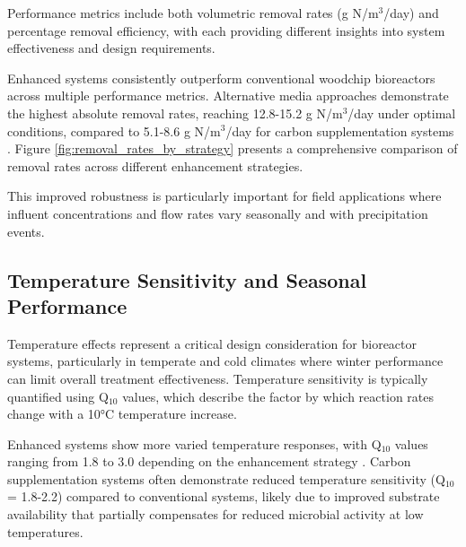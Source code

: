 \documentclass[12pt,a4paper]{article}
\begin{document}
 Performance metrics include both volumetric removal rates (g N/m$^3$/day) and percentage removal efficiency, with each providing different insights into system effectiveness and design requirements.

Enhanced systems consistently outperform conventional woodchip bioreactors across multiple performance metrics.  Alternative media approaches demonstrate the highest absolute removal rates, reaching 12.8-15.2 g N/m$^3$/day under optimal conditions, compared to 5.1-8.6 g N/m$^3$/day for carbon supplementation systems \citep{RN242, RN629, RN958}. Figure \ref{fig:removal_rates_by_strategy} presents a comprehensive comparison of removal rates across different enhancement strategies.

 This improved robustness is particularly important for field applications where influent concentrations and flow rates vary seasonally and with precipitation events.

\subsection{Temperature Sensitivity and Seasonal Performance}

Temperature effects represent a critical design consideration for bioreactor systems, particularly in temperate and cold climates where winter performance can limit overall treatment effectiveness.  Temperature sensitivity is typically quantified using Q$_{10}$ values, which describe the factor by which reaction rates change with a 10°C temperature increase.

 Enhanced systems show more varied temperature responses, with Q$_{10}$ values ranging from 1.8 to 3.0 depending on the enhancement strategy \citep{RN635, RN632}. Carbon supplementation systems often demonstrate reduced temperature sensitivity (Q$_{10}$ = 1.8-2.2) compared to conventional systems, likely due to improved substrate availability that partially compensates for reduced microbial activity at low temperatures.
\end{document}
